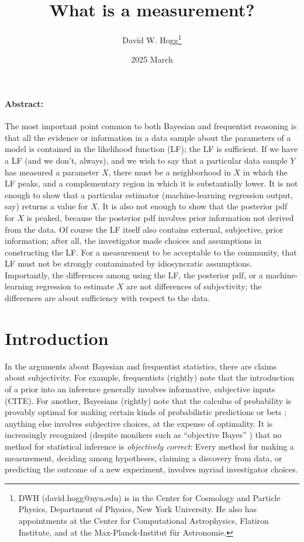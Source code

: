 \documentclass{article}
\title{\bfseries
What is a measurement?}
\author{David W. Hogg\footnote{%
DWH (david.hogg@nyu.edu) is in the Center for Cosmology and Particle Physics, Department of Physics, New York University.
He also has appointments at the Center for Computational Astrophysics, Flatiron Institute, and at the Max-Planck-Institut f\"ur Astronomie.}}
\date{2025 March}
\begin{document}
\maketitle\thispagestyle{empty}

\paragraph{Abstract:}
The most important point common to both Bayesian and frequentist reasoning is that all the evidence or information in a data sample about the parameters of a model is contained in the likelihood function (LF); the LF is sufficient.
If we have a LF (and we don't, always), and we wish to say that a particular data sample $Y$ has measured a parameter $X$, there must be a neighborhood in $X$ in which the LF peaks, and a complementary region in which it is substantially lower.
It is not enough to show that a particular estimator (machine-learning regression output, say) returns a value for $X$.
It is also not enough to show that the posterior pdf for $X$ is peaked, because the posterior pdf involves prior information not derived from the data.
Of course the LF itself also contains external, subjective, prior information; after all, the investigator made choices and assumptions in constructing the LF.
For a measurement to be acceptable to the community, that LF must not be strongly contaminated by idiosyncratic assumptions.
Importantly, the differences among using the LF, the posterior pdf, or a machine-learning regression to estimate $X$ are not differences of subjectivity; the differences are about sufficiency with respect to the data.

\section{Introduction}\label{sec:intro}
In the arguments about Bayesian and frequentist statistics, there are claims about subjectivity.
For example, frequentists (rightly) note that the introduction of a prior into an inference generally involves informative, subjective inputs (CITE).
For another, Bayesians (rightly) note that the calculus of probability is provably optimal for making certain kinds of probabilistic predictions or bets \cite{jaynes}; anything else involves subjective choices, at the expense of optimality.
It is increasingly recognized (despite monikers such as ``objective Bayes'' \cite{objective}) that no method for statistical inference is \emph{objectively correct}:
Every method for making a measurement, deciding among hypotheses, claiming a discovery from data, or predicting the outcome of a new experiment, involves myriad investigator choices.
\end{document}
